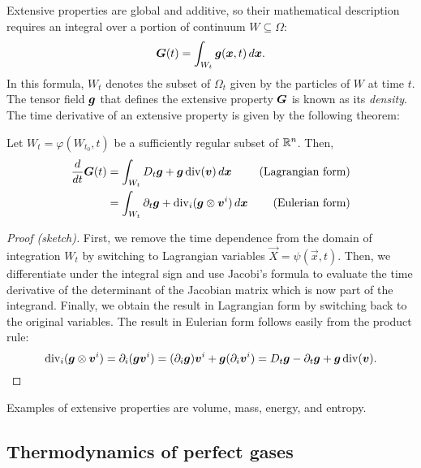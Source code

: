 Extensive properties are global and additive, so their mathematical
description requires an integral over a portion of continuum
$W \subseteq \Omega$:
\begin{equation} \label{eq:definizione-estensiva}
\bm{G}(t) = \int_{W_t} \bm{g}(\bm{x},t) \, d\bm{x}.
\end{equation}
In this formula, $W_t$ denotes the subset of $\Omega_t$ given by
the particles of $W$ at time $t$. The tensor field $\bm{g}$ that defines
the extensive property $\bm{G}$ is known as its \emph{density}.
The time derivative of an extensive property is given by the following theorem:

\begin{teor} \label{teor:reynolds}
Let $W_t = \varphi(W_{t_0},t)$ be a sufficiently regular subset of $\mathbb{R}^n$.
Then,
\begin{align*}
\frac{d}{dt} \bm{G}(t)
&= \int_{W_t} D_t \bm{g} + \bm{g} \operatorname{div}(\bm{v}) \, d\bm{x}
	& \text{(Lagrangian form)} \\
&= \int_{W_t} \partial_t \bm{g} + \operatorname{div}_i(\bm{g} \otimes \bm{v}^i) \, d\bm{x}
	& \text{(Eulerian form)}
\end{align*}
\end{teor}

\begin{proof}[Proof (sketch)]
First, we remove the time dependence from the domain of integration $W_t$
by switching to Lagrangian variables $\vec{X} = \psi(\vec{x},t)$.
Then, we differentiate under the integral sign and use Jacobi's formula
to evaluate the time derivative of the determinant of the Jacobian matrix
which is now part of the integrand.
Finally, we obtain the result in Lagrangian form by switching back to
the original variables. The result in Eulerian form follows easily
from the product rule:
\[
\operatorname{div}_i(\bm{g} \otimes \bm{v}^i)
= \partial_i (\bm{g} \bm{v}^i)
= (\partial_i \bm{g}) \bm{v}^i + \bm{g} (\partial_i \bm{v}^i)
= D_t \bm{g} - \partial_t \bm{g} + \bm{g} \operatorname{div}(\bm{v}). \qedhere
\]
\end{proof}
\noindent Examples of extensive properties are volume, mass, energy, and entropy.

\subsection*{Thermodynamics of perfect gases}

